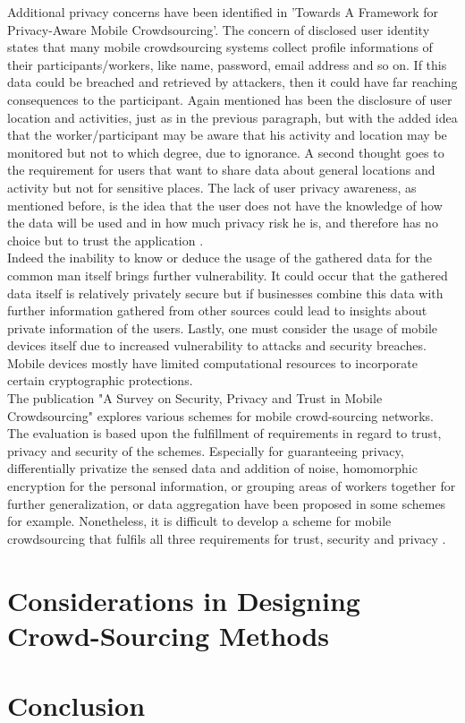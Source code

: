 \documentclass[a4paper,12pt]{report}
\begin{document}
			Additional privacy concerns have been identified in 'Towards A Framework for Privacy-Aware Mobile Crowdsourcing'. The concern of disclosed user identity states that many mobile crowdsourcing systems collect profile informations of their participants/workers, like name, password, email address and so on. If this data could be breached and retrieved by attackers, then it could have far reaching consequences to the participant. Again mentioned has been the disclosure of user location and activities, just as in the previous paragraph, but with the added idea that the worker/participant may be aware that his activity and location may be monitored but not to which degree, due to ignorance. A second thought goes to the requirement for users that want to share data about general locations and activity but not for sensitive places. The lack of user privacy awareness, as mentioned before, is the idea that the user does not have the knowledge of how the data will be used and in how much privacy risk he is, and therefore has no choice but to trust the application \cite{PrivacyAwareMCS}.\\
			Indeed the inability to know or deduce the usage of the gathered data for the common man itself brings further vulnerability. It could occur that the gathered data itself is relatively privately secure but if businesses combine this data with further information gathered from other sources could lead to insights about private information of the users. Lastly, one must consider the usage of mobile devices itself due to increased vulnerability to attacks and security breaches. Mobile devices mostly have limited computational resources to incorporate certain cryptographic protections.\\
			The publication "A Survey on Security, Privacy and Trust in Mobile Crowdsourcing" explores various schemes for mobile crowd-sourcing networks. The evaluation is based upon the fulfillment of requirements in regard to trust, privacy and security of the schemes. Especially for guaranteeing privacy, differentially privatize the sensed data and addition of noise, homomorphic encryption for the personal information, or grouping areas of workers together for further generalization, or data aggregation have been proposed in some schemes for example. Nonetheless, it is difficult to develop a scheme for mobile crowdsourcing that fulfils all three requirements for trust, security and privacy \cite{SecPriTrustMCS}.
		\closesection
	\closesection


	\chapter{Considerations in Designing Crowd-Sourcing Methods}
	\startsection
	\closesection
	
	\chapter{Conclusion}
	\startsection
	\closesection
	
	\newpage
	\printbibliography
\end{document}
